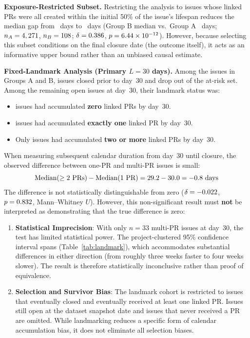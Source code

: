\textbf{Exposure-Restricted Subset.} Restricting the analysis to issues whose linked PRs were all created within the initial 50\% of the issue's lifespan reduces the median gap from \valmedDiff{}~days to \valdetDiff{}~days (Group B median \valdetMedB{} vs.\ Group A \valdetMedA{}~days; $n_A=4,271$, $n_B=108$; $\delta = 0.386$, $p = 6.44\times 10^{-12}$). However, because selecting this subset conditions on the final closure date (the outcome itself), it acts as an informative upper bound rather than an unbiased causal estimate.

\textbf{Fixed-Landmark Analysis (Primary $L=30$ days).} Among the \vallmCohort{} issues in Groups A and B, \vallmClosed{} issues closed prior to day~30 and drop out of the at-risk set. Among the remaining \vallmAtRisk{} open issues at day~30, their landmark status was:
\begin{itemize}
  \item \vallmNZero{} issues had accumulated \textbf{zero} linked PRs by day~30.
  \item \vallmNOne{} issues had accumulated \textbf{exactly one} linked PR by day~30.
  \item Only \vallmNM{} issues had accumulated \textbf{two or more} linked PRs by day~30.
\end{itemize}

When measuring subsequent calendar duration from day~30 until closure, the observed difference between one-PR and multi-PR issues is small:
\begin{equation}
\text{Median}(\ge 2\text{ PRs}) - \text{Median}(1\text{ PR}) = 29.2{} - 30.0{} = -0.8\text{ days}
\end{equation}
The difference is not statistically distinguishable from zero ($\delta = -0.022$, $p = 0.832$, Mann--Whitney $U$). However, this non-significant result must \textbf{not} be interpreted as demonstrating that the true difference is zero:
\begin{enumerate}
  \item \textbf{Statistical Imprecision}: With only $n=33$ multi-PR issues at day~30, the test has limited statistical power. The project-clustered 95\% confidence interval spans \vallmCI{} (Table~\ref{tab:landmark}), which accommodates substantial differences in either direction (from roughly three weeks faster to four weeks slower). The result is therefore statistically inconclusive rather than proof of equivalence.
  \item \textbf{Selection and Survivor Bias}: The landmark cohort is restricted to issues that eventually closed and eventually received at least one linked PR. Issues still open at the dataset snapshot date and issues that never received a PR are omitted. While landmarking reduces a specific form of calendar accumulation bias, it does not eliminate all selection biases.
\end{enumerate}

